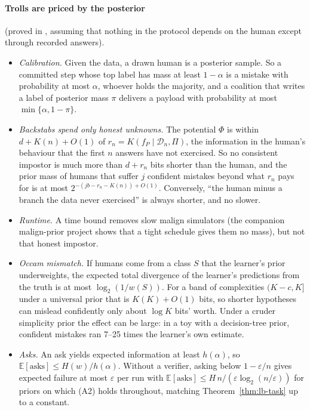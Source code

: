 \documentclass[11pt]{article}
\theoremstyle{definition}
\theoremstyle{remark}
\newcommand{\K}{K}
\newcommand{\Ex}{\mathbb{E}}
\begin{document}
\paragraph{Trolls are priced by the posterior} (proved in \cite{threadGA}, assuming that nothing in the protocol depends on the human except through recorded answers).
\begin{itemize}[nosep]
\item \emph{Calibration.} Given the data, a drawn human is a posterior sample. So a committed step whose top label has mass at least $1-\alpha$ is a mistake with probability at most $\alpha$, whoever holds the majority, and a coalition that writes a label of posterior mass $\pi$ delivers a payload with probability at most $\min\{\alpha,1-\pi\}$.
\item \emph{Backstabs spend only honest unknowns.} The potential $\Phi$ is within $d+\K(n)+O(1)$ of $r_n=\K(f_P\mid\mathcal D_n,\Pi)$, the information in the human's behaviour that the first $n$ answers have not exercised. So no consistent impostor is much more than $d+r_n$ bits shorter than the human, and the prior mass of humans that suffer $j$ confident mistakes beyond what $r_n$ pays for is at most $2^{-(jb-r_n-\K(n))+O(1)}$. Conversely, ``the human minus a branch the data never exercised'' is always shorter, and no slower.
\item \emph{Runtime.} A time bound removes slow malign simulators (the companion malign-prior project shows that a tight schedule gives them no mass), but not that honest impostor.
\item \emph{Occam mismatch.} If humans come from a class $S$ that the learner's prior underweights, the expected total divergence of the learner's predictions from the truth is at most $\log_2(1/w(S))$. For a band of complexities $(\K-c,\K]$ under a universal prior that is $\K(\K)+O(1)$ bits, so shorter hypotheses can mislead confidently only about $\log\K$ bits' worth. Under a cruder simplicity prior the effect can be large: in a toy with a decision-tree prior, confident mistakes ran 7--25 times the learner's own estimate.
\item \emph{Asks.} An ask yields expected information at least $h(\alpha)$, so $\Ex[\text{asks}]\le H(w)/h(\alpha)$. Without a verifier, asking below $1-\varepsilon/n$ gives expected failure at most $\varepsilon$ per run with $\Ex[\text{asks}]\le H\,n/(\varepsilon\log_2(n/\varepsilon))$ for priors on which (A2) holds throughout, matching Theorem~\ref{thm:lb-task} up to a constant.
\end{itemize}
\end{document}
